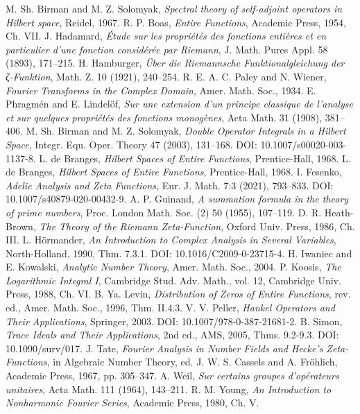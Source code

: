 \documentclass[12pt]{article}
\begin{document}
\begin{thebibliography}{20}
 M. Sh. Birman and M. Z. Solomyak, \emph{Spectral theory of self-adjoint operators in Hilbert space}, Reidel, 1967.
 R. P. Boas, \emph{Entire Functions}, Academic Press, 1954, Ch. VII.
 J. Hadamard, \emph{Étude sur les propriétés des fonctions entières et en particulier d'une fonction considérée par Riemann}, J. Math. Pures Appl. 58 (1893), 171–215.
 H. Hamburger, \emph{Über die Riemannsche Funktionalgleichung der ζ-Funktion}, Math. Z. 10 (1921), 240–254.
 R. E. A. C. Paley and N. Wiener, \emph{Fourier Transforms in the Complex Domain}, Amer. Math. Soc., 1934.
 E. Phragmén and E. Lindelöf, \emph{Sur une extension d'un principe classique de l'analyse et sur quelques propriétés des fonctions monogènes}, Acta Math. 31 (1908), 381–406.
 M. Sh. Birman and M. Z. Solomyak, \emph{Double Operator Integrals in a Hilbert Space}, Integr. Equ. Oper. Theory 47 (2003), 131–168. DOI: 10.1007/s00020-003-1137-8.
 L. de Branges, \emph{Hilbert Spaces of Entire Functions}, Prentice-Hall, 1968.
 L. de Branges, \emph{Hilbert Spaces of Entire Functions}, Prentice-Hall, 1968.
 I. Fesenko, \emph{Adelic Analysis and Zeta Functions}, Eur. J. Math. 7:3 (2021), 793–833. DOI: 10.1007/s40879-020-00432-9.
 A. P. Guinand, \emph{A summation formula in the theory of prime numbers}, Proc. London Math. Soc. (2) 50 (1955), 107–119.
 D. R. Heath-Brown, \emph{The Theory of the Riemann Zeta-Function}, Oxford Univ. Press, 1986, Ch. III.
 L. Hörmander, \emph{An Introduction to Complex Analysis in Several Variables}, North-Holland, 1990, Thm. 7.3.1. DOI: 10.1016/C2009-0-23715-4.
 H. Iwaniec and E. Kowalski, \emph{Analytic Number Theory}, Amer. Math. Soc., 2004.
 P. Koosis, \emph{The Logarithmic Integral I}, Cambridge Stud. Adv. Math., vol. 12, Cambridge Univ. Press, 1988, Ch. VI.
 B. Ya. Levin, \emph{Distribution of Zeros of Entire Functions}, rev. ed., Amer. Math. Soc., 1996, Thm. II.4.3.
 V. V. Peller, \emph{Hankel Operators and Their Applications}, Springer, 2003. DOI: 10.1007/978-0-387-21681-2.
 B. Simon, \emph{Trace Ideals and Their Applications}, 2nd ed., AMS, 2005, Thms. 9.2-9.3. DOI: 10.1090/surv/017.
 J. Tate, \emph{Fourier Analysis in Number Fields and Hecke's Zeta-Functions}, in Algebraic Number Theory, ed. J. W. S. Cassels and A. Fröhlich, Academic Press, 1967, pp. 305–347.
 A. Weil, \emph{Sur certains groupes d'opérateurs unitaires}, Acta Math. 111 (1964), 143–211.
 R. M. Young, \emph{An Introduction to Nonharmonic Fourier Series}, Academic Press, 1980, Ch. V.
\end{thebibliography}
\end{document}
